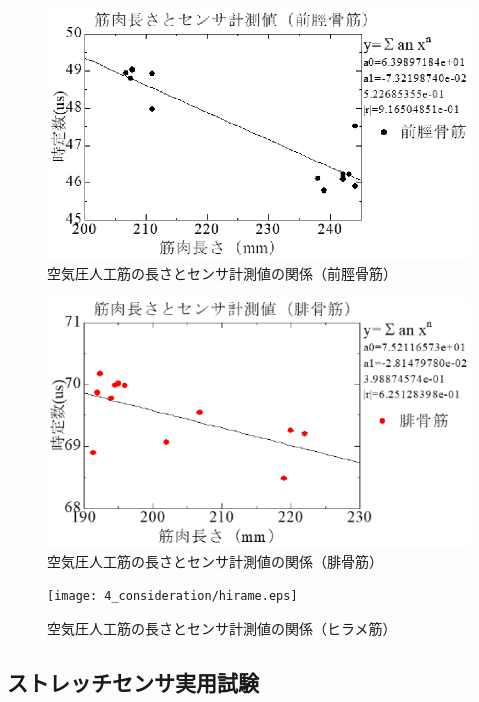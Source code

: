 \begin{figure}[h]
    \begin{center}
        \includegraphics[width=0.78\columnwidth,clip]{4_consideration/zenkei.eps}
    \end{center}
    \caption{空気圧人工筋の長さとセンサ計測値の関係（前脛骨筋）}
    \label{ml-rc1}
\end{figure}

\begin{figure}[h]
    \begin{center}
        \includegraphics[width=0.78\columnwidth,clip]{4_consideration/hikotsu.eps}
    \end{center}
    \caption{空気圧人工筋の長さとセンサ計測値の関係（腓骨筋）}
    \label{ml-rc2}
\end{figure}

\begin{figure}[h]
    \begin{center}
        \texttt{[image: 4\_consideration/hirame.eps]}
    \end{center}
    \caption{空気圧人工筋の長さとセンサ計測値の関係（ヒラメ筋）}
    \label{ml-rc3}
\end{figure}

\newpage

\subsection{ストレッチセンサ実用試験}
